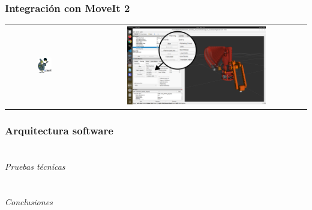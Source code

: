 \documentclass{beamer}
\begin{document}
\begin{frame}
\frametitle{Integración con MoveIt 2}
\begin{table}[htbp]
  \centering
  \begin{tabular}{cc}
      \includegraphics[width=0.2\textwidth, valign=m]{figs/setup_assistant.jpg} & \includegraphics[width=0.65\textwidth, valign=m]{figs/moveit_demo_trajectory.png} 
  \end{tabular}
\end{table}  
\end{frame}

\begin{frame}
\frametitle{Arquitectura software}
    
\end{frame}

\section*{}
\begin{frame}{}
  \centering \Huge
  \emph{Pruebas técnicas}
\end{frame}

\section*{}
\begin{frame}{}
  \centering \Huge
  \emph{Conclusiones}
\end{frame}
\end{document}
